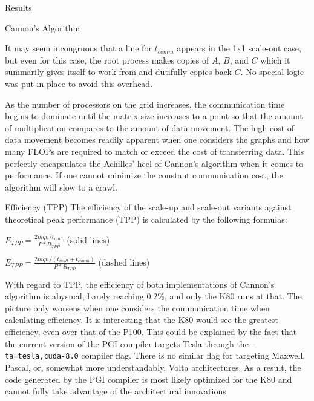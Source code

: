 \documentclass{article}
\begin{document}
\begin{section}{Results}
\begin{subsection}{Cannon's Algorithm}
\begin{paragraph}{}
      It may seem incongruous that a line for $t_{comm}$ appears in the 1x1 scale-out case, but even for this case,
      the root process makes copies of $A$, $B$, and $C$ which it summarily gives itself to work from and dutifully
      copies back $C$. No special logic was put in place to avoid this overhead.
    \end{paragraph}
    \begin{paragraph}{}
      As the number of processors on the grid increases, the communication time begins to dominate until the
      matrix size increases to a point so that the amount of multiplication compares to the amount of data movement.
      The high cost of data movement becomes readily apparent when one considers the graphs and how many FLOPs are
      required to match or exceed the cost of transferring data. This perfectly encapsulates the Achilles' heel of
      Cannon's algorithm when it comes to performance. If one cannot minimize the constant communication cost,
      the algorithm will slow to a crawl.
    \end{paragraph}
    \begin{paragraph}{Efficiency (TPP)}
      The efficiency of the scale-up and scale-out variants against theoretical peak performance (TPP) is calculated by the following formulas\autocite[][14]{Lecture10Slides}:
      \begin{subparagraph}{}
        $E_{TPP} = \frac{2mqn/t_{mult}}{P*R_{TPP}}$ (solid lines)
      \end{subparagraph}
      \begin{subparagraph}{}
        $E_{TPP} = \frac{2mqn/(t_{mult}+t_{comm})}{P*R_{TPP}}$ (dashed lines)
      \end{subparagraph}
    \end{paragraph}
    \begin{paragraph}{}
      With regard to TPP, the efficiency of both implementations of Cannon's algorithm is abysmal, barely reaching 0.2\%, and only the K80 runs at that.
      The picture only worsens when one considers the communication time when calculating efficiency. It is interesting that the K80 would see the greatest
      efficiency, even over that of the P100. This could be explained by the fact that the current version of the PGI compiler targets Tesla through the
      \texttt{-ta=tesla,cuda-8.0} compiler flag. There is no similar flag for targeting Maxwell, Pascal, or, somewhat more understandably, Volta architectures.
      As a result, the code generated by the PGI compiler is most likely optimized for the K80 and cannot fully take advantage of the architectural innovations

\end{paragraph}
\end{subsection}
\end{section}
\end{document}
